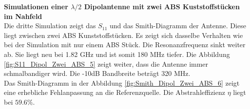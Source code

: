 \newpage
\textbf{Simulationen einer $\lambda/2$ Dipolantenne mit zwei ABS Kuststoffstücken im Nahfeld}\\

Die dritte Simulation zeigt das $S_{11}$ und das Smith-Diagramm der Antenne. Diese liegt zwischen zwei ABS Kunststoffstücken. Es zeigt sich dasselbe Verhalten wie bei der Simulation mit nur einem ABS Stück. Die Resonanzfrequenz sinkt weiter ab. Sie liegt neu bei 1.82 GHz und ist somit 180 MHz tiefer. Die Abbildung  \ref{fig:S11_Dipol_Zwei_ABS_5} zeigt weiter, dass die Antenne immer schmalbandiger wird. Die -10dB Bandbreite beträgt 320 MHz.\\
Das Smith-Diagramm in der Abbildung \ref{fig:Smith_Dipol_Zwei_ABS_6} zeigt eine erhebliche Fehlanpassung an die Referenzquelle. Die Abstrahleffizienz $\eta$ liegt  bei $59.6 \%$.

